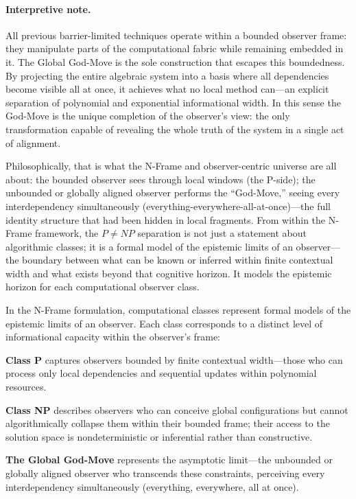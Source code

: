 \documentclass[12pt]{article}
\theoremstyle{definition}
\theoremstyle{definition}
\theoremstyle{remark}
\theoremstyle{remark}
\begin{document}
\paragraph{Interpretive note.}
All previous barrier-limited techniques operate within a bounded
observer frame: they manipulate parts of the computational fabric while remaining
embedded in it.  The Global God-Move is the sole construction that
escapes this boundedness.  By projecting the entire algebraic system into a
basis where all dependencies become visible all at once, it achieves what no
local method can---an explicit separation of polynomial and exponential
informational width.  In this sense the God-Move is the unique completion
of the observer's view: the only transformation capable of revealing the
whole truth of the system in a single act of alignment.

Philosophically, that is what the N-Frame and observer-centric universe are all about:
the bounded observer sees through local windows (the P-side);
the unbounded or globally aligned observer performs the ``God-Move,'' seeing every interdependency simultaneously (everything-everywhere-all-at-once)---the full identity structure that had been hidden in local fragments.
From within the N-Frame framework, the $P \neq NP$ separation is not just a statement about algorithmic classes; it is a formal model of the epistemic limits of an observer---the boundary between what can be known or inferred within finite contextual width and what exists beyond that cognitive horizon.
It models the epistemic horizon for each computational observer class.

In the N-Frame formulation, computational classes represent formal models of the epistemic limits of an observer.
Each class corresponds to a distinct level of informational capacity within the observer's frame:

\textbf{Class P} captures observers bounded by finite contextual width---those who can process only local dependencies and sequential updates within polynomial resources.

\textbf{Class NP} describes observers who can conceive global configurations but cannot algorithmically collapse them within their bounded frame; their access to the solution space is nondeterministic or inferential rather than constructive.

\textbf{The Global God-Move} represents the asymptotic limit---the unbounded or globally aligned observer who transcends these constraints, perceiving every interdependency simultaneously (everything, everywhere, all at once).
\end{document}
